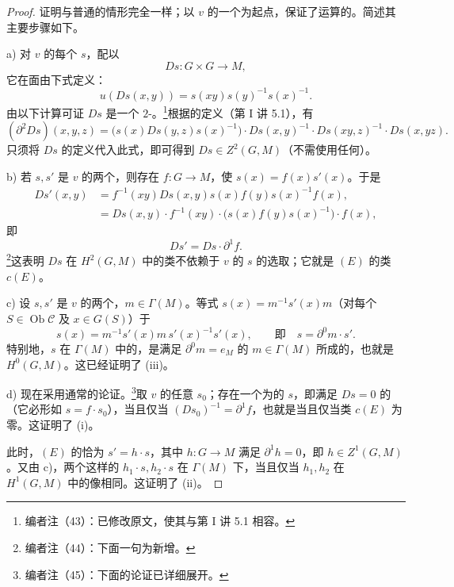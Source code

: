 \begin{proof}
证明与普通的情形完全一样；以 $v$ 的一个为起点，保证了运算的。简述其主要步骤如下。

 a) 对 $v$ 的每个 $s$，配以
\[
 Ds:G\times G\longrightarrow M,
\]
它在面由下式定义：
\[
 u(Ds(x,y))=s(xy)s(y)^{-1}s(x)^{-1}.
\]
由以下计算可证 $Ds$ 是一个 $2$-。\footnote{编者注（43）：已修改原文，使其与第 I 讲 5.1 相容。}根据的定义（第 I 讲 5.1），有
\[
 (\partial^2Ds)(x,y,z)
 =\bigl(s(x)Ds(y,z)s(x)^{-1}\bigr)\cdot Ds(x,y)^{-1}
 \cdot Ds(xy,z)^{-1}\cdot Ds(x,yz).
\]
只须将 $Ds$ 的定义代入此式，即可得到 $Ds\in Z^2(G,M)$（不需使用任何）。

 b) 若 $s,s'$ 是 $v$ 的两个，则存在 $f:G\to M$，使 $s(x)=f(x)s'(x)$。于是
\begin{align*}
 Ds'(x,y)&=f^{-1}(xy)Ds(x,y)s(x)f(y)s(x)^{-1}f(x),\\
 &=Ds(x,y)\cdot f^{-1}(xy)\cdot\bigl(s(x)f(y)s(x)^{-1}\bigr)\cdot f(x),
\end{align*}
即
\[
 Ds'=Ds\cdot\partial^1f.
\]
\footnote{编者注（44）：下面一句为新增。}这表明 $Ds$ 在 $H^2(G,M)$ 中的类不依赖于 $v$ 的 $s$ 的选取；它就是 $(E)$ 的类 $c(E)$。

 c) 设 $s,s'$ 是 $v$ 的两个，$m\in\Gamma(M)$。等式 $s(x)=m^{-1}s'(x)m$（对每个 $S\in\operatorname{Ob}\mathcal C$ 及 $x\in G(S)$）于
\[
 s(x)=m^{-1}s'(x)m\,s'(x)^{-1}s'(x),\qquad\text{即}\quad s=\partial^0m\cdot s'.
\]
特别地，$s$ 在 $\Gamma(M)$ 中的，是满足 $\partial^0m=e_M$ 的 $m\in\Gamma(M)$ 所成的，也就是 $H^0(G,M)$。这已经证明了 (iii)。

 d) 现在采用通常的论证。\footnote{编者注（45）：下面的论证已详细展开。}取 $v$ 的任意 $s_0$；存在一个为的 $s$，即满足 $Ds=0$ 的（它必形如 $s=f\cdot s_0$），当且仅当 $(Ds_0)^{-1}=\partial^1f$，也就是当且仅当类 $c(E)$ 为零。这证明了 (i)。

此时，$(E)$ 的恰为 $s'=h\cdot s$，其中 $h:G\to M$ 满足 $\partial^1h=0$，即 $h\in Z^1(G,M)$。又由 c)，两个这样的 $h_1\cdot s,h_2\cdot s$ 在 $\Gamma(M)$ 下，当且仅当 $h_1,h_2$ 在 $H^1(G,M)$ 中的像相同。这证明了 (ii)。
\end{proof}
